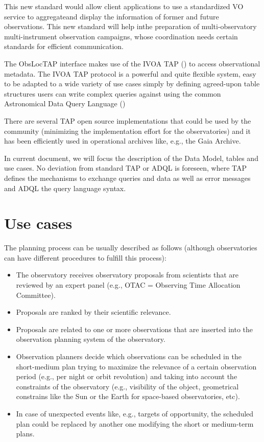 \documentclass[11pt,a4paper]{ivoa}
\begin{document}
This new standard would allow client applications to use a standardized VO service
to aggregateand display the information of former and future observations. This new standard will help 
inthe preparation of multi-observatory multi-instrument observation campaigns, whose 
coordination needs certain standards for efficient communication.

The ObsLocTAP interface makes use of the IVOA TAP (\cite{2019ivoa.spec.0927D}) to access observational metadata. The IVOA TAP protocol is a powerful and quite flexible
system, easy to be adapted to a wide variety of use cases simply by defining 
agreed-upon table structures users can write complex queries against using the common
Astronomical Data Query Language (\cite{2008ivoa.spec.1030O})

There are several TAP open source implementations that could be used by the community (minimizing the implementation effort for the observatories) and it has been
efficiently used in operational archives like, e.g., the Gaia Archive.

In current document, we will focus the description of the Data Model, tables and use cases. No deviation from standard TAP or ADQL is foreseen, where TAP defines the mechanisms to exchange queries and data as well as error messages and ADQL the
query language syntax.

\section{Use cases}
The planning process can be usually described as follows (although observatories can 
have different procedures to fulfill this process): 

\begin{itemize}
	\item The observatory receives observatory proposals from scientists that are reviewed by an expert panel (e.g., OTAC = Observing Time Allocation Committee). \par

	\item Proposals are ranked by their scientific relevance.

	\item Proposals are related to one or more observations that are inserted into the observation planning system of the observatory.

	\item Observation planners decide which observations can be scheduled in the short-medium plan trying to maximize the relevance of a certain observation period (e.g., per night or orbit revolution) and taking into account the constraints of the observatory (e.g., visibility of the object, geometrical constrains like the Sun or the Earth for space-based observatories, etc).

	\item In case of unexpected events like, e.g., targets of opportunity, the scheduled plan could be replaced by another one modifying the short or medium-term plans.
\end{itemize}
\end{document}
